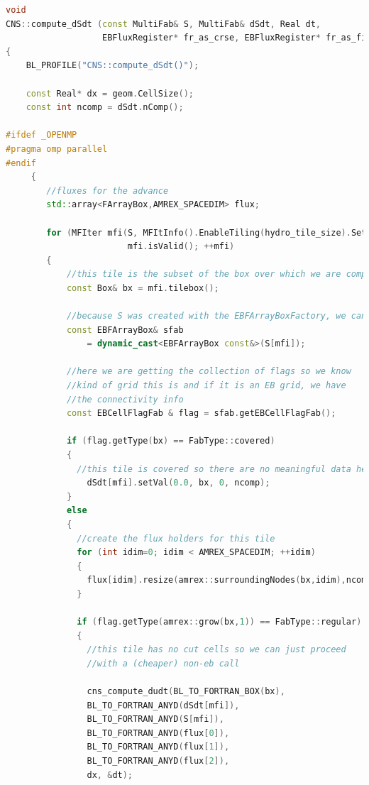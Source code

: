 \begin{lstlisting}[language=cpp]
void
CNS::compute_dSdt (const MultiFab& S, MultiFab& dSdt, Real dt,
                   EBFluxRegister* fr_as_crse, EBFluxRegister* fr_as_fine)
{
    BL_PROFILE("CNS::compute_dSdt()");

    const Real* dx = geom.CellSize();
    const int ncomp = dSdt.nComp();

#ifdef _OPENMP
#pragma omp parallel
#endif
     {
        //fluxes for the advance
        std::array<FArrayBox,AMREX_SPACEDIM> flux;

        for (MFIter mfi(S, MFItInfo().EnableTiling(hydro_tile_size).SetDynamic(true));
                        mfi.isValid(); ++mfi)
        {
            //this tile is the subset of the box over which we are computing
            const Box& bx = mfi.tilebox();

            //because S was created with the EBFArrayBoxFactory, we can do this cast
            const EBFArrayBox& sfab
                = dynamic_cast<EBFArrayBox const&>(S[mfi]);
            
            //here we are getting the collection of flags so we know
            //kind of grid this is and if it is an EB grid, we have
            //the connectivity info
            const EBCellFlagFab & flag = sfab.getEBCellFlagFab();

            if (flag.getType(bx) == FabType::covered) 
            {
              //this tile is covered so there are no meaningful data here
                dSdt[mfi].setVal(0.0, bx, 0, ncomp);
            } 
            else 
            {
              //create the flux holders for this tile
              for (int idim=0; idim < AMREX_SPACEDIM; ++idim) 
              {
                flux[idim].resize(amrex::surroundingNodes(bx,idim),ncomp);
              }

              if (flag.getType(amrex::grow(bx,1)) == FabType::regular)
              {
                //this tile has no cut cells so we can just proceed
                //with a (cheaper) non-eb call

                cns_compute_dudt(BL_TO_FORTRAN_BOX(bx),
                BL_TO_FORTRAN_ANYD(dSdt[mfi]),
                BL_TO_FORTRAN_ANYD(S[mfi]),
                BL_TO_FORTRAN_ANYD(flux[0]),
                BL_TO_FORTRAN_ANYD(flux[1]),
                BL_TO_FORTRAN_ANYD(flux[2]),
                dx, &dt);


\end{lstlisting}
